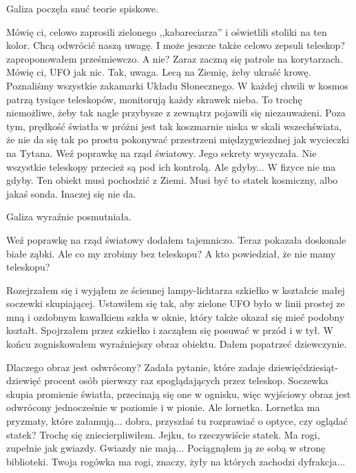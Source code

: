 Galiza poczęła snuć teorie spiskowe.
\begin{dialogue}
	\ds{} Mówię ci, celowo zaprosili zielonego ,,kabareciarza'' i oświetlili stoliki na ten kolor. Chcą odwrócić naszą uwagę.
	\ds{} I może jeszcze także celowo zepsuli teleskop? \dm{} zaproponowałem prześmiewczo.
	\ds{} A nie? Zaraz zaczną się patrole na korytarzach. Mówię ci, UFO jak nic.
	\ds{} Tak, uwaga. Lecą na Ziemię, żeby ukraść krowę. Poznaliśmy wszystkie zakamarki Układu Słonecznego. W każdej chwili w kosmos patrzą tysiące teleskopów, monitorują każdy skrawek nieba. To trochę niemożliwe, żeby tak nagle przybysze z zewnątrz pojawili się niezauważeni. Poza tym, prędkość światła w próżni jest tak koszmarnie niska w skali wszechświata, że nie da się tak po prostu pokonywać przestrzeni międzygwiezdnej jak wycieczki na Tytana.
	\ds{} Weź poprawkę na rząd światowy. Jego sekrety \dm{} wysyczała.
	\ds{} Nie wszystkie teleskopy przecież są pod ich kontrolą. 
	\ds{} Ale gdyby...
	\ds{} W fizyce nie ma gdyby. Ten obiekt musi pochodzić z Ziemi. Musi być to statek kosmiczny, albo jakaś sonda. Inaczej się nie da.
\end{dialogue}

Galiza wyraźnie posmutniała.

\begin{dialogue}
	\ds{} Weź poprawkę na rząd światowy \dm{} dodałem tajemniczo. Teraz pokazała doskonale białe ząbki.
	\ds{} Ale co my zrobimy bez teleskopu?
	\ds{} A kto powiedział, że nie mamy teleskopu?
\end{dialogue}

Rozejrzałem się i wyjąłem ze ściennej lampy-lichtarza szkiełko w kształcie małej soczewki skupiającej.
Ustawiłem się tak, aby zielone UFO było w linii prostej ze mną i ozdobnym kawałkiem szkła w oknie, który także okazał się mieć podobny kształt.
Spojrzałem przez szkiełko i zacząłem się posuwać w przód i w tył. W końcu zogniskowałem wyraźniejszy obraz obiektu.
Dałem popatrzeć dziewczynie.

\begin{dialogue}
	\ds{} Dlaczego obraz jest odwrócony? \dm{} Zadała pytanie, które zadaje dziewięćdziesiąt-dziewięć procent osób pierwszy raz spoglądających przez teleskop.
	\ds{} Soczewka skupia promienie światła, przecinają się one w ognisku, więc wyjściowy obraz jest odwrócony jednocześnie w poziomie i w pionie.
	\ds{} Ale lornetka.
	\ds{} Lornetka ma pryzmaty, które załamują... dobra, przyszłaś tu rozprawiać o optyce, czy oglądać statek? \dm{} Trochę się zniecierpliwiłem.
	\ds{} Jejku, to rzeczywiście statek. Ma rogi, zupełnie jak gwiazdy.
	\ds{} Gwiazdy nie mają... \dm{} Pociągnąłem ją ze sobą w stronę biblioteki. \dm{} Twoja rogówka ma rogi, znaczy, żyły na których zachodzi dyfrakcja...
\end{dialogue}

